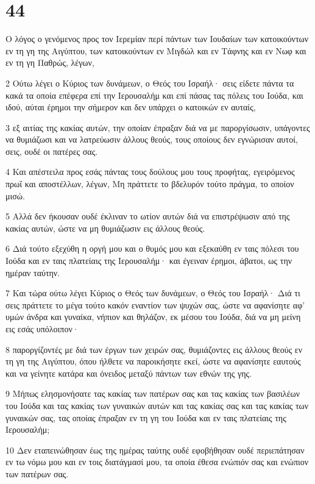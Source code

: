\chapter{44}

\par Ο λόγος ο γενόμενος προς τον Ιερεμίαν περί πάντων των Ιουδαίων των κατοικούντων εν τη γη της Αιγύπτου, των κατοικούντων εν Μιγδώλ και εν Τάφνης και εν Νωφ και εν τη γη Παθρώς, λέγων,
\par 2 Ούτω λέγει ο Κύριος των δυνάμεων, ο Θεός του Ισραήλ· σεις είδετε πάντα τα κακά τα οποία επέφερα επί την Ιερουσαλήμ και επί πάσας τας πόλεις του Ιούδα, και ιδού, αύται έρημοι την σήμερον και δεν υπάρχει ο κατοικών εν αυταίς,
\par 3 εξ αιτίας της κακίας αυτών, την οποίαν έπραξαν διά να με παροργίσωσιν, υπάγοντες να θυμιάζωσι και να λατρεύωσιν άλλους θεούς, τους οποίους δεν εγνώρισαν αυτοί, σεις, ουδέ οι πατέρες σας.
\par 4 Και απέστειλα προς εσάς πάντας τους δούλους μου τους προφήτας, εγειρόμενος πρωΐ και αποστέλλων, λέγων, Μη πράττετε το βδελυρόν τούτο πράγμα, το οποίον μισώ.
\par 5 Αλλά δεν ήκουσαν ουδέ έκλιναν το ωτίον αυτών διά να επιστρέψωσιν από της κακίας αυτών, ώστε να μη θυμιάζωσιν εις άλλους θεούς.
\par 6 Διά τούτο εξεχύθη η οργή μου και ο θυμός μου και εξεκαύθη εν ταις πόλεσι του Ιούδα και εν ταις πλατείαις της Ιερουσαλήμ· και έγειναν έρημοι, άβατοι, ως την ημέραν ταύτην.
\par 7 Και τώρα ούτω λέγει Κύριος ο Θεός των δυνάμεων, ο Θεός του Ισραήλ· Διά τι σεις πράττετε το μέγα τούτο κακόν εναντίον των ψυχών σας, ώστε να αφανίσητε αφ' υμών άνδρα και γυναίκα, νήπιον και θηλάζον, εκ μέσου του Ιούδα, διά να μη μείνη εις εσάς υπόλοιπον·
\par 8 παροργίζοντές με διά των έργων των χειρών σας, θυμιάζοντες εις άλλους θεούς εν τη γη της Αιγύπτου, όπου ήλθετε να παροικήσητε εκεί, ώστε να αφανίσητε εαυτούς και να γείνητε κατάρα και όνειδος μεταξύ πάντων των εθνών της γης.
\par 9 Μήπως ελησμονήσατε τας κακίας των πατέρων σας και τας κακίας των βασιλέων του Ιούδα και τας κακίας των γυναικών αυτών και τας κακίας σας και τας κακίας των γυναικών σας, τας οποίας έπραξαν εν τη γη του Ιούδα και εν ταις πλατείαις της Ιερουσαλήμ;
\par 10 Δεν εταπεινώθησαν έως της ημέρας ταύτης ουδέ εφοβήθησαν ουδέ περιεπάτησαν εν τω νόμω μου και εν τοις διατάγμασί μου, τα οποία έθεσα ενώπιόν σας και ενώπιον των πατέρων σας.
